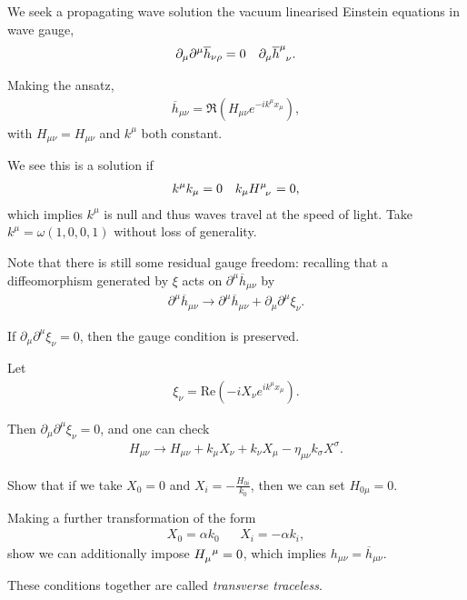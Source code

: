 
We seek a propagating wave solution the vacuum linearised Einstein equations in wave gauge,
\begin{align}
    \partial_\mu \partial^{\mu} \overline{h}_{\nu \rho} = 0 && \partial_\mu \tensor{\overline{h}}{^{\mu}_{\nu}}
.\end{align}

Making the ansatz,
\begin{align}
    \overline{h}_{\mu \nu} = \Re \left( H_{\mu \nu} e^{-i k^{\mu} x_{\mu}} \right) 
,\end{align}
with $H_{\mu \nu} = H_{\mu \nu}$ and $k^{\mu}$ both constant.

We see this is a solution if
\begin{align}
    k^{\mu} k_\mu = 0 && k_{\mu} \tensor{H}{^{\mu}_\nu} = 0
,\end{align}
which implies $k^{\mu}$ is null and thus waves travel at the speed of light. Take $k^{\mu} = \omega \left( 1,0,0,1 \right) $ without loss of generality.

Note that there is still some residual gauge freedom: recalling that a diffeomorphism generated by $\xi$ acts on $\partial^{\mu} \overline{h}_{\mu \nu}$ by
\begin{align}
    \partial^{\mu} \overline{h}_{\mu \nu} \to \partial^{\mu} \overline{h}_{\mu \nu} + \partial_\mu \partial^{\mu} \xi_\nu
.\end{align}

If $\partial_\mu \partial^{\mu} \xi_\nu = 0$, then the gauge condition is preserved. 

Let
\begin{align}
    \xi_\nu = \text{Re}\left( -i X_\nu e^{i k^{\mu} x_\mu} \right) 
.\end{align}

Then $\partial_\mu \partial^{\mu} \xi_\nu = 0$, and one can check
\begin{align}
    H_{\mu \nu} \to H_{\mu \nu} + k_\mu X_\nu + k_\nu X_\mu - \eta_{\mu \nu} k_\sigma X^{\sigma}
.\end{align}

\begin{exercise}
    Show that if we take $X_0 = 0$ and $X_{i} = - \frac{H_{0i}}{k_0}$, then we can set $H_{0\mu} = 0$.

    Making a further transformation of the form
    \begin{align}
        X_0 = \alpha k_0 && X_{i} = - \alpha k_{i}
    ,\end{align}
    show we can additionally impose $\tensor{H}{_{\mu}^{\mu}} = 0$, which implies $h_{\mu \nu} = \overline{h}_{\mu \nu}$. 

    These conditions together are called \textit{transverse traceless}.
\end{exercise}

